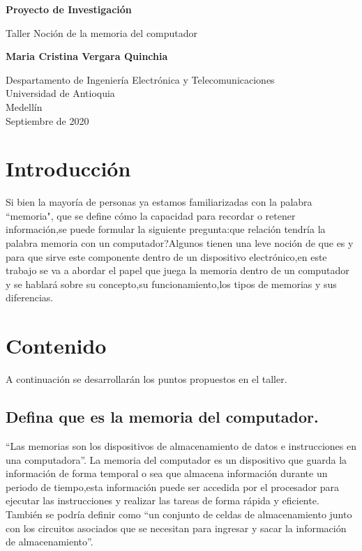 \documentclass{article}
\begin{document}
\begin{titlepage}
    \begin{center}
        \vspace*{1cm}
            
        \Huge
        \textbf{Proyecto de Investigación}
            
        \vspace{0.5cm}
        \LARGE
        Taller Noción de la memoria del computador
            
        \vspace{1.5cm}
            
        \textbf{Maria Cristina Vergara Quinchia}
            
        \vfill
            
        \vspace{0.8cm}
            
        \Large
        Despartamento de Ingeniería Electrónica y Telecomunicaciones\\
        Universidad de Antioquia\\
        Medellín\\
        Septiembre de 2020
            
    \end{center}
\end{titlepage}

\tableofcontents
\newpage
\section{Introducción}\label{intro}
Si bien la mayoría de personas ya estamos familiarizadas con la palabra  “memoria", que se  define cómo la capacidad para recordar o retener información,se puede formular la siguiente pregunta:que relación tendría la palabra memoria con un computador?Algunos tienen una leve noción de que es y para que sirve este componente dentro de un dispositivo electrónico,en este trabajo se va a abordar el papel que juega la memoria dentro de un computador y se hablará sobre su concepto,su funcionamiento,los tipos de memorias y sus diferencias.
\section{Contenido}\label{contenido}
A continuación se desarrollarán los puntos propuestos en el taller.

\subsection{Defina que es la memoria del computador.}
 “Las memorias son los dispositivos de almacenamiento de datos e instrucciones en una computadora”\cite{UNT}.
La memoria del computador es un dispositivo que guarda la información de forma temporal o sea que almacena información durante un periodo de tiempo,esta información puede ser accedida  por el procesador para ejecutar las instrucciones y realizar las tareas de forma rápida y eficiente.
También se podría definir como “un conjunto de celdas de almacenamiento junto con los circuitos asociados que se necesitan para ingresar y sacar la información de almacenamiento”\cite{FIng}.
\end{document}
